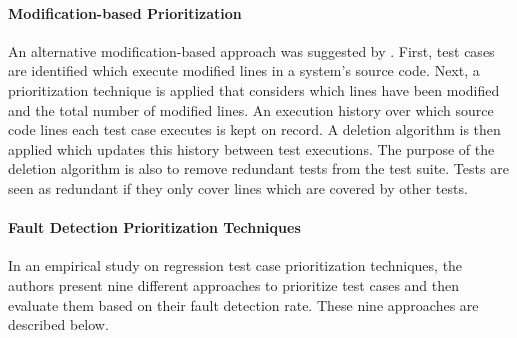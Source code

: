 \documentclass[a4paper,english,12pt]{report}
\begin{document}
\paragraph{Modification-based Prioritization \citep{malhotra2010regression}}
An alternative modification-based approach was suggested by \citet{malhotra2010regression}. First, test cases are identified which execute modified lines in a system's source code. Next, a prioritization technique is applied that considers which lines have been modified and the total number of modified lines. An execution history over which source code lines each test case executes is kept on record. A deletion algorithm is then applied which updates this history between test executions. The purpose of the deletion algorithm is also to remove redundant tests from the test suite. Tests are seen as redundant if they only cover lines which are covered by other tests. \citep{malhotra2010regression}

\paragraph{Fault Detection Prioritization Techniques \citep{rothermel1999testcase}}
In an empirical study on regression test case prioritization techniques, the authors \citet{rothermel1999testcase} present nine different approaches to prioritize test cases and then evaluate them based on their fault detection rate. These nine approaches are described below. \citep{rothermel1999testcase}
\end{document}
